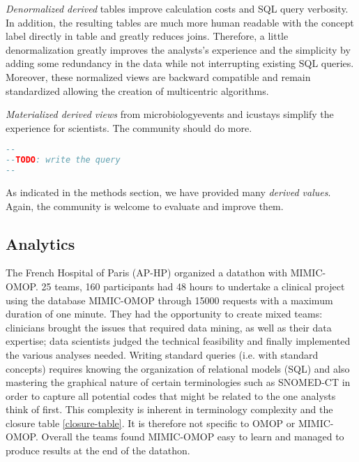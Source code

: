 \emph{Denormalized derived} tables improve calculation costs and SQL query verbosity. 
In addition, the resulting tables are much more human readable with the concept 
label directly in table and greatly reduces joins. Therefore, a little 
denormalization greatly improves the analysts's experience and the simplicity
 by adding some redundancy in the data while not interrupting existing SQL queries. 
Moreover, these normalized views are backward compatible and remain 
standardized allowing the creation of multicentric algorithms.

\emph{Materialized derived views} from microbiologyevents and icustays simplify 
the experience for scientists. The community should do more.
                    
\begin{lstlisting}[language=sql,basicstyle=\scriptsize,caption=Optimized table microbiology SQL query,label={lst:optimized}]
--
--TODO: write the query
--
\end{lstlisting}

As indicated in the methods section, we have provided many \emph{derived values}. 
Again, the community is welcome to evaluate and improve them.   


%
%

\subsection{Analytics}

%
%

The French Hospital of Paris (AP-HP) organized a datathon with MIMIC-OMOP. 
25 teams, 160 participants had 48 hours to undertake a clinical project using 
the database MIMIC-OMOP through 15000 requests with a maximum duration of
one minute. They had the opportunity to create mixed teams: clinicians brought 
the issues that required data mining, as well as their data expertise; 
data scientists judged the technical feasibility and finally implemented the 
various analyses needed. Writing standard queries (i.e. with standard concepts) 
requires knowing the organization of relational models (SQL) and also mastering 
the graphical nature of certain terminologies such as SNOMED-CT in order to 
capture all potential codes that might be related to the one analysts think of 
first. This complexity is inherent in terminology complexity and the closure
table \ref{closure-table}. It is therefore not specific to OMOP or MIMIC-OMOP.
Overall the teams found MIMIC-OMOP easy to learn and managed to produce results
at the end of the datathon.

